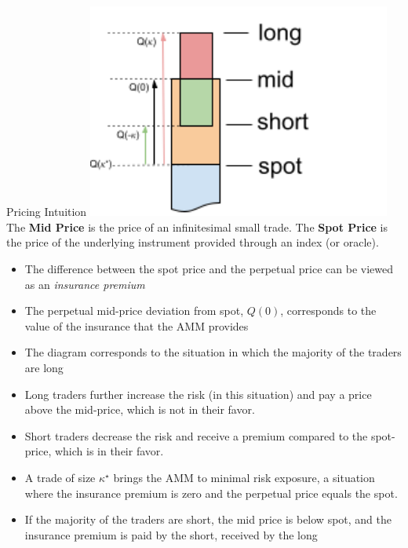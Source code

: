 \documentclass[10pt,a4paper]{article}
\begin{document}
\begin{multicols}{3}
\begin{textbox}{Pricing Intuition}
\includegraphics[width=0.75\textwidth]{pricing.png}\\
The \textbf{Mid Price} is the price of an infinitesimal small trade.
The \textbf{Spot Price} is the price of the underlying instrument provided through
an index (or oracle).
\begin{itemize}
    \item The difference between the spot price and the perpetual price
can be viewed as an \emph{insurance premium}
\item The perpetual mid-price deviation from spot, $Q(0)$, 
    corresponds to the value of the insurance that the AMM provides
\item The diagram corresponds to the situation in which the majority of the traders are long
\item Long traders further increase the risk (in this situation) and pay a price above the mid-price,
    which is not in their favor.
\item Short traders decrease
    the risk and receive a premium compared to the spot-price, which is in their favor.
\item A trade of size $\kappa^\star$ brings the AMM to minimal risk exposure,
    a situation where the insurance premium is zero and the perpetual price equals the spot.
\item If the majority of the traders are short, the mid price is below spot, and
    the insurance premium is paid by the short, received by the long
\end{itemize}
\end{textbox}


\end{multicols}
\end{document}
